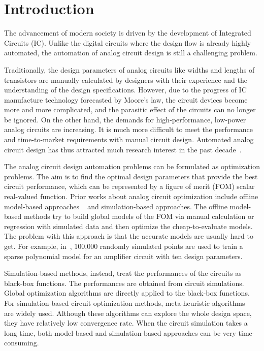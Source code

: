 \section{Introduction}

%
The advancement of modern society is driven by the development of Integrated
Circuits (IC). Unlike the digital circuits where the design flow is already
highly automated, the automation of analog circuit design is still a
challenging problem.

Traditionally, the design parameters of analog circuits like widths and lengths of
transistors are manually calculated by designers with their experience and the
understanding of the design specifications. However, due to the progress of IC
manufacture technology forecasted by Moore's law, the circuit devices become
more and more complicated, and the parasitic effect of the circuits can no
longer be ignored. On the other hand, the demands for high-performance,
low-power analog circuits are increasing. It is much more difficult to
meet the performance and time-to-market requirements with manual circuit design.
Automated analog circuit design has thus attracted much research interest in
the past decade~\cite{rutenbar2007hierarchical}.

The analog circuit design automation problems can be formulated as optimization
problems. The aim is to find the optimal design parameters that provide the
best circuit performance, which can be represented by a figure of merit (FOM)
scalar real-valued function. Prior works about analog circuit optimization
include offline model-based approaches
~\cite{colleran2003optimization,daems2003simulation,wang2014enabling} and
simulation-based approaches. The offline model-based methods try to build
global models of the FOM via manual calculation or regression with simulated
data and then optimize the cheap-to-evaluate models. The problem with this
approach is that the accurate models are usually hard to get. For example,
in~\cite{wang2014enabling}, 100,000 randomly simulated points are used to train
a sparse polynomial model for an amplifier circuit with ten design parameters.

Simulation-based methods, instead, treat the performances of the circuits as black-box functions. The performances are obtained from circuit simulations. Global optimization
algorithms are directly applied to the black-box functions. For
simulation-based circuit optimization methods, meta-heuristic
algorithms~\cite{phelps2000anaconda, liu2009analog} are widely used. Although
these algorithms can explore the whole design space, they have relatively low
convergence rate. When the circuit simulation takes a long time, both
model-based and simulation-based approaches can be very time-consuming.

